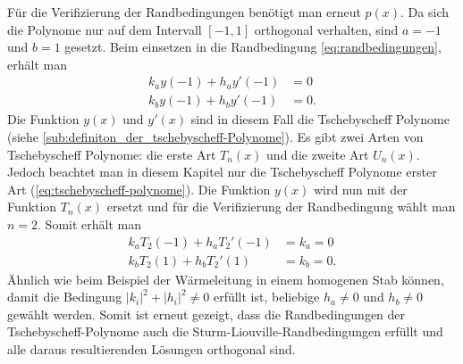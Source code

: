 Für die Verifizierung der Randbedingungen benötigt man erneut $p(x)$.
Da sich die Polynome nur auf dem Intervall $[ -1,1 ]$ orthogonal verhalten, sind $a = -1$ und $b = 1$ gesetzt.
Beim einsetzen in die Randbedingung \ref{eq:randbedingungen}, erhält man
\[
\begin{aligned}
	k_a y(-1) + h_a y'(-1) &= 0 \\
	k_b y(-1) + h_b y'(-1) &= 0.
\end{aligned} 
\]
Die Funktion $y(x)$ und $y'(x)$ sind in diesem Fall die Tschebyscheff Polynome (siehe \ref{sub:definiton_der_tschebyscheff-Polynome}).
Es gibt zwei Arten von Tschebyscheff Polynome: die erste Art $T_n(x)$ und die zweite Art $U_n(x)$.
Jedoch beachtet man in diesem Kapitel nur die Tschebyscheff Polynome erster Art (\ref{eq:tschebyscheff-polynome}).
Die Funktion $y(x)$ wird nun mit der Funktion $T_n(x)$ ersetzt und für die Verifizierung der Randbedingung wählt man $n=2$.
Somit erhält man
\[
	\begin{aligned}
	k_a T_2(-1) + h_a T_{2}'(-1) &= k_a = 0\\
	k_b T_2(1) + h_b T_{2}'(1) &= k_b = 0.
\end{aligned}
\]
Ähnlich wie beim Beispiel der Wärmeleitung in einem homogenen Stab können, damit die Bedingung $|k_i|^2 + |h_i|^2\ne 0$ erfüllt ist, beliebige $h_a \ne 0$ und $h_b \ne 0$ gewählt werden.
Somit ist erneut gezeigt, dass die Randbedingungen der Tschebyscheff-Polynome auch die Sturm-Liouville-Randbedingungen erfüllt und alle daraus resultierenden Lösungen orthogonal sind.
